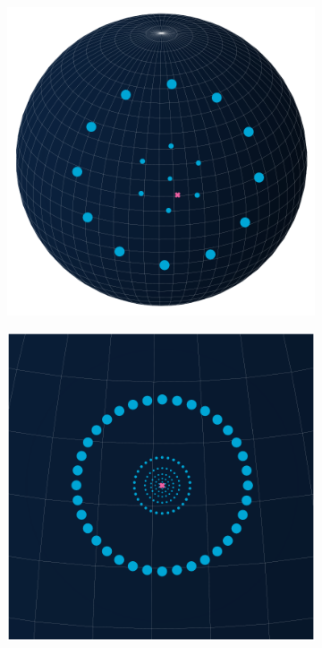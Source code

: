 \begin{figure}[t]
    \centering

    \begin{subfigure}[c]{0.49\textwidth}
        \includegraphics[width=\textwidth]{figures/plots/knocke_paneling_high.pdf}
    \end{subfigure}
   \hfill
    \begin{subfigure}[c]{0.49\textwidth}
        \includegraphics[width=\textwidth]{figures/plots/knocke_paneling_low.pdf}
        \label{fig:general-knocke-paneling-low}
    \end{subfigure}


\end{figure}
